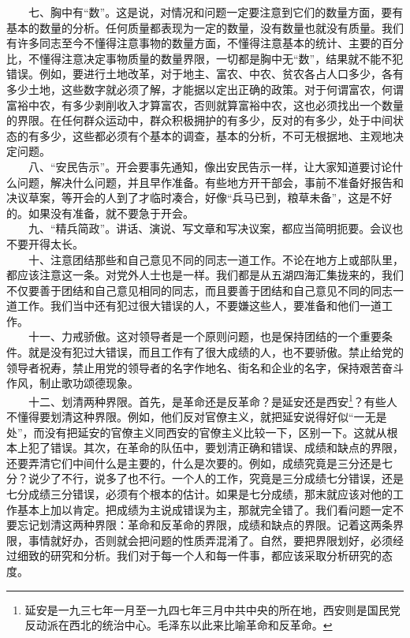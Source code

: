 \documentclass[cn,11pt,chinese]{elegantbook}
\begin{document}
　　七、胸中有“数”。这是说，对情况和问题一定要注意到它们的数量方面，要有基本的数量的分析。任何质量都表现为一定的数量，没有数量也就没有质量。我们有许多同志至今不懂得注意事物的数量方面，不懂得注意基本的统计、主要的百分比，不懂得注意决定事物质量的数量界限，一切都是胸中无“数”，结果就不能不犯错误。例如，要进行土地改革，对于地主、富农、中农、贫农各占人口多少，各有多少土地，这些数字就必须了解，才能据以定出正确的政策。对于何谓富农，何谓富裕中农，有多少剥削收入才算富农，否则就算富裕中农，这也必须找出一个数量的界限。在任何群众运动中，群众积极拥护的有多少，反对的有多少，处于中间状态的有多少，这些都必须有个基本的调查，基本的分析，不可无根据地、主观地决定问题。\\
　　八、“安民告示”。开会要事先通知，像出安民告示一样，让大家知道要讨论什么问题，解决什么问题，并且早作准备。有些地方开干部会，事前不准备好报告和决议草案，等开会的人到了才临时凑合，好像“兵马已到，粮草未备”，这是不好的。如果没有准备，就不要急于开会。\\
　　九、“精兵简政”。讲话、演说、写文章和写决议案，都应当简明扼要。会议也不要开得太长。\\
　　十、注意团结那些和自己意见不同的同志一道工作。不论在地方上或部队里，都应该注意这一条。对党外人士也是一样。我们都是从五湖四海汇集拢来的，我们不仅要善于团结和自己意见相同的同志，而且要善于团结和自己意见不同的同志一道工作。我们当中还有犯过很大错误的人，不要嫌这些人，要准备和他们一道工作。\\
　　十一、力戒骄傲。这对领导者是一个原则问题，也是保持团结的一个重要条件。就是没有犯过大错误，而且工作有了很大成绩的人，也不要骄傲。禁止给党的领导者祝寿，禁止用党的领导者的名字作地名、街名和企业的名字，保持艰苦奋斗作风，制止歌功颂德现象。\\
　　十二、划清两种界限。首先，是革命还是反革命？是延安还是西安\footnote[3]{ 延安是一九三七年一月至一九四七年三月中共中央的所在地，西安则是国民党反动派在西北的统治中心。毛泽东以此来比喻革命和反革命。}？有些人不懂得要划清这种界限。例如，他们反对官僚主义，就把延安说得好似“一无是处”，而没有把延安的官僚主义同西安的官僚主义比较一下，区别一下。这就从根本上犯了错误。其次，在革命的队伍中，要划清正确和错误、成绩和缺点的界限，还要弄清它们中间什么是主要的，什么是次要的。例如，成绩究竟是三分还是七分？说少了不行，说多了也不行。一个人的工作，究竟是三分成绩七分错误，还是七分成绩三分错误，必须有个根本的估计。如果是七分成绩，那末就应该对他的工作基本上加以肯定。把成绩为主说成错误为主，那就完全错了。我们看问题一定不要忘记划清这两种界限：革命和反革命的界限，成绩和缺点的界限。记着这两条界限，事情就好办，否则就会把问题的性质弄混淆了。自然，要把界限划好，必须经过细致的研究和分析。我们对于每一个人和每一件事，都应该采取分析研究的态度。\\
\end{document}

